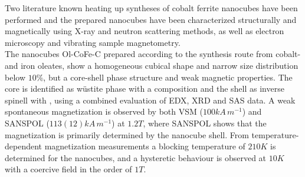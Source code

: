\documentclass[\main/dresen_thesis.tex]{subfiles}
\begin{document}
  \label{sec:monolayers:nanoparticle:discussion:summary}
  Two literature known heating up syntheses of cobalt ferrite nanocubes have been performed and the prepared nanocubes have been characterized structurally and magnetically using X-ray and neutron scattering methods, as well as electron microscopy and vibrating sample magnetometry.
  \\

  The nanocubes Ol-CoFe-C prepared according to the synthesis route from cobalt- and iron oleates, show a homogeneous cubical shape and narrow size distribution below $10 \%$, but a core-shell phase structure and weak magnetic properties.
  The core is identified as w\"ustite phase with a  composition and the shell as inverse spinell with , using a combined evaluation of EDX, XRD and SAS data.
  A weak spontaneous magnetization is observed by both VSM ($100 \unit{kA \, m^{-1}}$) and SANSPOL ($113(12) \unit{kA \, m^{-1}}$) at $1.2 \unit{T}$, where SANSPOL shows that the magnetization is primarily determined by the nanocube shell.
  From temperature-dependent magnetization measurements a blocking temperature of $210 \unit{K}$ is determined for the nanocubes, and a hysteretic behaviour is observed at $10 \unit{K}$ with a coercive field in the order of $1 \unit{T}$.
  \\
\end{document}
